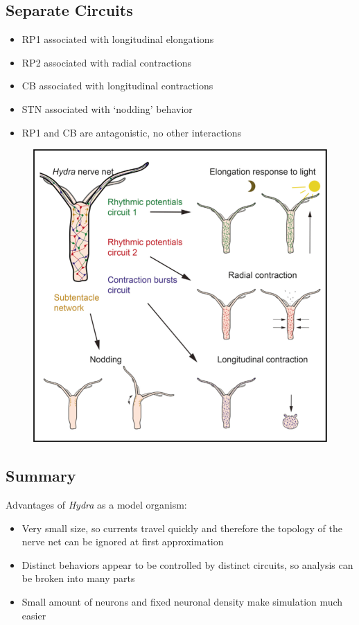\documentclass{article}
\begin{document}
\subsection{Separate Circuits}
\begin{itemize}
\item RP1 associated with longitudinal elongations
\item RP2 associated with radial contractions
\item CB associated with longitudinal contractions
\item STN associated with `nodding' behavior
\item RP1 and CB are antagonistic, no other interactions
\end{itemize}
\begin{figure}
\center
\includegraphics[scale=0.325]{hydra_movements.png}
\end{figure}


\subsection{Summary}
Advantages of \textit{Hydra} as a model organism:
\begin{itemize}
\item Very small size, so currents travel quickly and therefore the topology of the nerve net can be ignored at first approximation
\item Distinct behaviors appear to be controlled by distinct circuits, so analysis can be broken into many parts
\item Small amount of neurons and fixed neuronal density make simulation much easier
\end{itemize}
\end{document}
